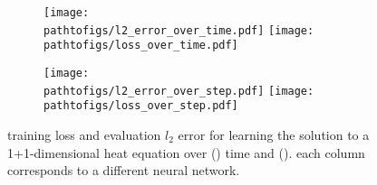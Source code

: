 \begin{figure}[!h]
  \centering
  \def\pathtofigs{../kfac_pinns_exp/exp24_heat1d_groupplot}
  \begin{subfigure}[t]{1.0\linewidth}
    \caption{}\label{subfig:heat1d-time}
    \texttt{[image: \\pathtofigs/l2\_error\_over\_time.pdf]}
    \texttt{[image: \\pathtofigs/loss\_over\_time.pdf]}
  \end{subfigure}
  \begin{subfigure}[t]{1.0\linewidth}
    \caption{}\label{subfig:heat1d-step}
    \texttt{[image: \\pathtofigs/l2\_error\_over\_step.pdf]}
    \texttt{[image: \\pathtofigs/loss\_over\_step.pdf]}
  \end{subfigure}
  \caption{training loss and evaluation $l_2$ error for learning the solution to a 1+1-dimensional heat equation over () time and (). each column corresponds to a different neural network.}\label{fig:heat1d-appendix}
\end{figure}

